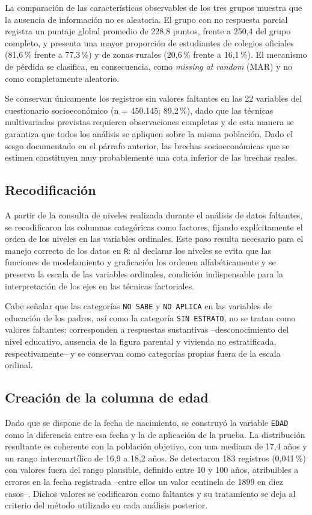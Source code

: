 \documentclass[12pt]{article}
\begin{document}
La comparación de las características observables de los tres grupos muestra que la ausencia de información no es aleatoria. El grupo con no respuesta parcial registra un puntaje global promedio de 228,8 puntos, frente a 250,4 del grupo completo, y presenta una mayor proporción de estudiantes de colegios oficiales (81,6\,\% frente a 77,3\,\%) y de zonas rurales (20,6\,\% frente a 16,1\,\%). El mecanismo de pérdida se clasifica, en consecuencia, como \textit{missing at random} (MAR) y no como completamente aleatorio.

Se conservan únicamente los registros sin valores faltantes en las 22 variables del cuestionario socioeconómico (n = 450.145; 89,2\,\%), dado que las técnicas multivariadas previstas requieren observaciones completas y de esta manera se garantiza que todos los análisis se apliquen sobre la misma población. Dado el sesgo documentado en el párrafo anterior, las brechas socioeconómicas que se estimen constituyen muy probablemente una cota inferior de las brechas reales.

\subsection{Recodificación}
A partir de la consulta de niveles realizada durante el análisis de datos faltantes, se recodificaron las columnas categóricas como factores, fijando explícitamente el orden de los niveles en las variables ordinales. Este paso resulta necesario para el manejo correcto de los datos en \texttt{R}: al declarar los niveles se evita que las funciones de modelamiento y graficación los ordenen alfabéticamente y se preserva la escala de las variables ordinales, condición indispensable para la interpretación de los ejes en las técnicas factoriales.

Cabe señalar que las categorías \texttt{NO SABE} y \texttt{NO APLICA} en las variables de educación de los padres, así como la categoría \texttt{SIN ESTRATO}, no se tratan como valores faltantes: corresponden a respuestas sustantivas --desconocimiento del nivel educativo, ausencia de la figura parental y vivienda no estratificada, respectivamente-- y se conservan como categorías propias fuera de la escala ordinal.

\subsection{Creación de la columna de edad}
Dado que se dispone de la fecha de nacimiento, se construyó la variable \texttt{EDAD} como la diferencia entre esa fecha y la de aplicación de la prueba. La distribución resultante es coherente con la población objetivo, con una mediana de 17,4 años y un rango intercuartílico de 16,9 a 18,2 años. Se detectaron 183 registros (0,041\,\%) con valores fuera del rango plausible, definido entre 10 y 100 años, atribuibles a errores en la fecha registrada --entre ellos un valor centinela de 1899 en diez casos--. Dichos valores se codificaron como faltantes y su tratamiento se deja al criterio del método utilizado en cada análisis posterior.
\end{document}
